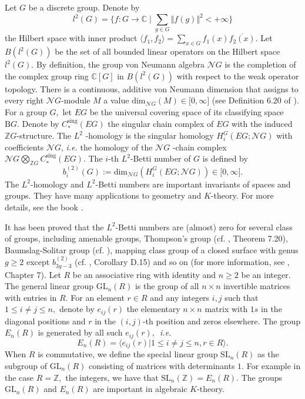 \documentclass{gtpart}     %
\begin{document}
Let $G$ be a discrete group. Denote by
\begin{equation*}
l^{2}(G)=\{f:G\rightarrow \mathbb{C}\mid \sum_{g\in G}\Vert f(g)\Vert
^{2}<+\infty \}
\end{equation*}%
the Hilbert space with inner product $\langle f_{1},f_{2}\rangle =\sum_{x\in
G}f_{1}(x)\overline{f_{2}(x)}$. Let $B(l^{2}(G))$ be the set of all bounded
linear operators on the Hilbert space $l^{2}(G).$ By definition, the group
von Neumann algebra $\mathcal{N}G$ is the completion of the complex group
ring $\mathbb{C}[G]$ in $B(l^{2}(G))$ with respect to the weak operator
topology. There is a continuous, additive von Neumann dimension that assigns
to every right $\mathcal{N}G$-module $M$ a value $\mathrm{dim}_{\mathcal{N}%
G}(M)\in \lbrack 0,\infty ]$ (see Definition 6.20 of \cite{lu}). For a group
$G,$ let $EG$ be the universal covering space of its classifying space $%
\mathrm{B}G.$ Denote by $C_{\ast }^{\text{sing}}(EG)$ the singular chain
complex of $EG$ with the induced $\mathbb{Z}G$-structure. The $L^{2}$%
-homology is the singular homology $H_{i}^{G}(EG;\mathcal{N}G)$ with
coefficients $\mathcal{N}G$, \textsl{i.e.} the homology of the $\mathcal{N}G$%
-chain complex $\mathcal{N}G\bigotimes_{\mathbb{Z}G}C_{\ast }^{\text{sing}%
}(EG).$ The $i$-th $L^{2}$-Betti number of $G$ is defined by%
\begin{equation*}
b_{i}^{(2)}(G):=\mathrm{dim}_{\mathcal{N}G}(H_{i}^{G}(EG;\mathcal{N}G))\in
\lbrack 0,\infty ].
\end{equation*}%
The $L^{2}$-homology and $L^{2}$-Betti numbers are important invariants of
spaces and groups. They have many applications to geometry and $K$-theory.
For more details, see the book \cite{lu}.

It has been proved that the $L^{2}$-Betti numbers are (almost) zero for
several class of groups, including amenable groups, Thompson's group (cf.
\cite{lu}, Theorem 7.20), Baumslag-Solitar group (cf. \cite{dl,bf}), mapping
class group of a closed surface with genus $g\geq 2$ except $b_{3g-3}^{(2)}$
(cf. \cite{ki}, Corollary D.15) and so on (for more information, see \cite%
{lu}, Chapter 7). Let $R$ be an associative ring with identity and $n\geq 2$
be an integer. The general linear group $\mathrm{GL}_{n}(R)$ is the group of
all $n\times n$ invertible matrices with entries in $R$. For an element $%
r\in R$ and any integers $i,j$ such that $1\leq i\neq j\leq n,$ denote by $%
e_{ij}(r)$ the elementary $n\times n$ matrix with $1s$ in the diagonal
positions and $r$ in the $(i,j)$-th position and zeros elsewhere. The group $%
E_{n}(R)$ is generated by all such $e_{ij}(r),$\textsl{\ i.e. }%
\begin{equation*}
E_{n}(R)=\langle e_{ij}(r)|1\leq i\neq j\leq n,r\in R\rangle .
\end{equation*}%
When $R$ is commutative, we define the special linear group $\mathrm{SL}%
_{n}(R)$ as the subgroup of $\mathrm{GL}_{n}(R)$ consisting of matrices with
determinants $1$. For example in the case $R=\mathbb{Z},$ the integers, we
have that $\mathrm{SL}_{n}(\mathbb{Z})=E_{n}(R).$ The groups $\mathrm{GL}%
_{n}(R)$ and $E_{n}(R)$ are important in algebraic $K$-theory.
\end{document}
